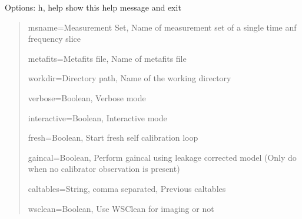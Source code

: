 \documentclass[letterpaper,10pt,english]{sphinxmanual}
\begin{document}
\sphinxAtStartPar
Options:  \sphinxhyphen{}h, \sphinxhyphen{}\sphinxhyphen{}help                                   show this help message and exit
\begin{quote}

\sphinxAtStartPar
\sphinxhyphen{}\sphinxhyphen{}msname=Measurement Set,    Name of measurement set of a single time anf frequency slice

\sphinxAtStartPar
\sphinxhyphen{}\sphinxhyphen{}metafits=Metafits file,    Name of metafits file

\sphinxAtStartPar
\sphinxhyphen{}\sphinxhyphen{}workdir=Directory path,    Name of the working directory

\sphinxAtStartPar
\sphinxhyphen{}\sphinxhyphen{}verbose=Boolean,                   Verbose mode

\sphinxAtStartPar
\sphinxhyphen{}\sphinxhyphen{}interactive=Boolean,               Interactive mode

\sphinxAtStartPar
\sphinxhyphen{}\sphinxhyphen{}fresh=Boolean,                     Start fresh self calibration loop

\sphinxAtStartPar
\sphinxhyphen{}\sphinxhyphen{}gaincal=Boolean,                   Perform gaincal using leakage corrected model (Only do when no calibrator observation is present)

\sphinxAtStartPar
\sphinxhyphen{}\sphinxhyphen{}caltables=String, comma separated, Previous caltables

\sphinxAtStartPar
\sphinxhyphen{}\sphinxhyphen{}wsclean=Boolean,                   Use WSClean for imaging or not
\end{quote}


\renewcommand{\indexname}{Python Module Index}
\begin{sphinxtheindex}
\let\bigletter\sphinxstyleindexlettergroup
\bigletter{p}
\item\relax{}
\item\relax{}
\item\relax{}
\item\relax{}
\item\relax{}
\item\relax{}
\item\relax{}
\end{sphinxtheindex}

\renewcommand{\indexname}{Index}
\printindex
\end{document}
